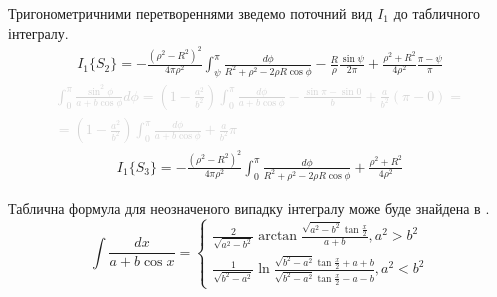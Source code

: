 Тригонометричними перетвореннями зведемо поточний вид $ I_1 $ до табличного 
інтегралу.
%
\begin{equation*} \begin{aligned}
I_{1} \{ S_2 \} = - \frac{\left( \rho^2 - R^2 \right)^2}{4 \pi \rho^2} 
\int_{\psi}^{\pi} \frac{d \phi}{R^2 + \rho^2 - 2 \rho R \cos \phi} - 
\frac{R}{\rho} \frac{\sin \psi}{2 \pi} +  
\frac{\rho^2 + R^2}{4 \rho^2} \frac{\pi - \psi}{\pi}
\end{aligned} \end{equation*}
%
\textcolor{lightgray}{ \begin{equation*} \begin{aligned}
\int_{0}^{\pi} \frac{\sin^2{\phi}}{a + b \cos \phi} d \phi =  
\left( 1 - \frac{a^2}{b^2} \right)
\int_{0}^{\pi} \frac{d \phi}{a + b \cos \phi} -
\frac{\sin \pi - \sin 0}{b} + \frac{a}{b^2} (\pi - 0) = \\
= \left( 1 - \frac{a^2}{b^2} \right)
\int_{0}^{\pi} \frac{d \phi}{a + b \cos \phi} +
\frac{a}{b^2} \pi
\end{aligned} \end{equation*} }
%
\begin{equation*} \begin{aligned}
I_{1} \{ S_3 \} = - \frac{\left( \rho^2 - R^2 \right)^2}{4 \pi \rho^2} 
\int_{0}^{\pi} \frac{d \phi}{R^2 + \rho^2 - 2 \rho R \cos \phi} + 
\frac{\rho^2 + R^2}{4 \rho^2}
\end{aligned} \end{equation*}

Таблична формула для неозначеного випадку інтегралу може буде знайдена в 
\cite[ст. 181]{ElementFunc1983}.
%
\begin{equation} \label{eq:caseTableIntegral}
\int \frac{d x}{a + b \cos{x}} = \begin{cases}
\frac{2}{\sqrt{a^2-b^2}} \arctan \frac{\sqrt{a^2-b^2} \tan \frac{x}{2}}
{a + b}, a^2 > b^2 \\
\frac{1}{\sqrt{b^2-a^2}} \ln 
\frac{\sqrt{b^2-a^2} \tan \frac{x}{2} + a + b}
{\sqrt{b^2-a^2} \tan \frac{x}{2} - a - b}, a^2 < b^2
\end{cases}
\end{equation}


